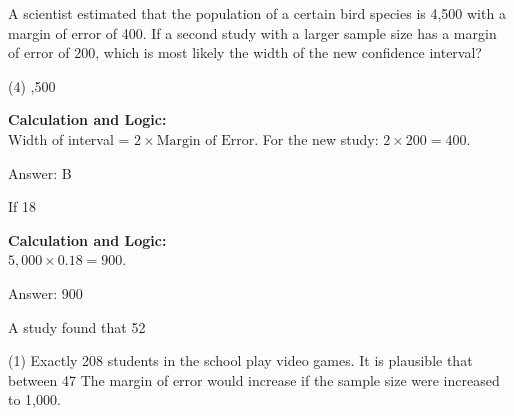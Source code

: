 \documentclass[11pt,paper=a4,answers]{exam}
\begin{document}
\begin{questions}
\vspace{60pt}

\question
A scientist estimated that the population of a certain bird species is 4,500 with a margin of error of 400. If a second study with a larger sample size has a margin of error of 200, which is most likely the width of the new confidence interval?
\begin{tasks}(4)
    ,500
\end{tasks}

\begin{solution}
\textbf{Calculation and Logic:} \\
Width of interval = $2 \times \text{Margin of Error}$. For the new study: $2 \times 200 = 400$.

\vspace{30pt}

Answer: \colorbox{yellow!100}{B}
\end{solution}

\vspace{60pt}

\question
If 18%

\begin{solution}
\textbf{Calculation and Logic:} \\
$5,000 \times 0.18 = 900$.

\vspace{30pt}

Answer: \colorbox{yellow!100}{900}
\end{solution}

\vspace{60pt}

\question
A study found that 52%
\begin{tasks}(1)
    \task Exactly 208 students in the school play video games.
    \task It is plausible that between 47%
    \task The margin of error would increase if the sample size were increased to 1,000.
\end{tasks}


\end{questions}
\end{document}
